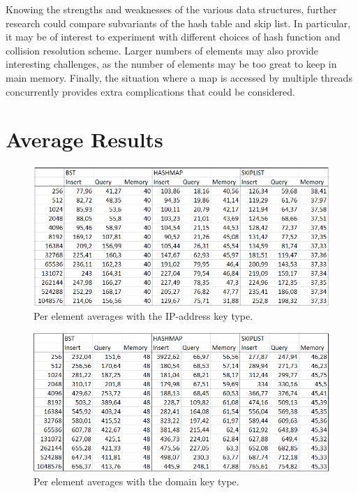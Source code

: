 \documentclass[12pt,a4paper]{article}
\begin{document}
    Knowing the strengths and weaknesses of the various data structures, further research could
    compare subvariants of the hash table and skip list.  In particular, it may be of interest to
    experiment with different choices of hash function and collision resolution scheme.  Larger
    numbers of elements may also provide interesting challenges, as the number of elements may be
    too great to keep in main memory.  Finally, the situation where a map is accessed by multiple
    threads concurrently provides extra complications that could be considered.

    

    

    \newpage
    \appendix
    \section{Average Results} \label{App:AveResults}

    \begin{figure}[h!]
    \centering
    \includegraphics[width=\textwidth]{ip-address-averages.png}
    \caption{Per element averages with the IP-address key type.}
    \end{figure}

    \begin{figure}[h!]
    \centering
    \includegraphics[width=\textwidth]{domain-averages.png}
    \caption{Per element averages with the domain key type.}
    \end{figure}
\end{document}
